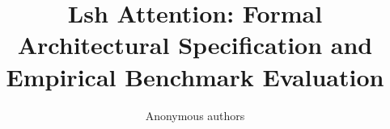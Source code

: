 \title{\textbf{Lsh Attention: Formal Architectural Specification and Empirical Benchmark Evaluation}}

\author{Anonymous authors}
